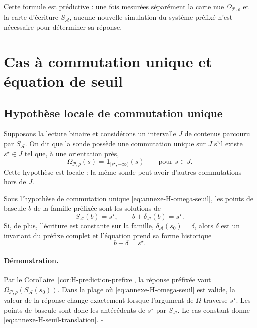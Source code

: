 Cette formule est prédictive : une fois mesurées séparément la carte nue
$\Omega_{\mathcal P,\rho}$ et la carte d'écriture
$S_{\mathcal A}$, aucune nouvelle simulation du système préfixé n'est
nécessaire pour déterminer sa réponse.

\section{Cas à commutation unique et équation de seuil}
\label{annexe-H-seuil}

\subsection{Hypothèse locale de commutation unique}
\label{annexe-H-commutation-unique}

Supposons la lecture binaire et considérons un intervalle $J$ de
contenus parcouru par $S_{\mathcal A}$. On dit que la sonde possède une
commutation unique sur $J$ s'il existe $s^{\star}\in J$ tel que, à une
orientation près,
\begin{equation}
\label{eq:annexe-H-omega-seuil}
\Omega_{\mathcal P,\rho}(s)
=
\mathbf 1_{[s^{\star},+\infty)}(s)
\qquad
\text{pour }s\in J.
\end{equation}
Cette hypothèse est locale : la même sonde peut avoir d'autres
commutations hors de $J$.

\begin{encadre}[title={Corollaire \theproposition{} --- Équation de seuil}]
Sous l'hypothèse de commutation unique
\eqref{eq:annexe-H-omega-seuil}, les points de bascule $b$ de la famille
préfixée sont les solutions de
\begin{equation}
\label{eq:annexe-H-seuil-general}
\boxed{
S_{\mathcal A}(b)=s^{\star},
\qquad
b+\delta_{\mathcal A}(b)=s^{\star}.
}
\end{equation}
Si, de plus, l'écriture est constante sur la famille,
$\delta_{\mathcal A}(s_0)=\delta$, alors $\delta$ est un invariant du
préfixe complet et l'équation prend sa forme historique
\begin{equation}
\label{eq:annexe-H-seuil-translation}
\boxed{
b+\delta=s^{\star}.
}
\end{equation}
\end{encadre}

\paragraph{Démonstration.}
Par le Corollaire~\ref{cor:H-prediction-prefixe}, la réponse préfixée vaut
$\Omega_{\mathcal P,\rho}(S_{\mathcal A}(s_0))$. Dans la plage où
\eqref{eq:annexe-H-omega-seuil} est valide, la valeur de la réponse
change exactement lorsque l'argument de $\Omega$ traverse
$s^{\star}$. Les points de bascule sont donc les antécédents de
$s^{\star}$ par $S_{\mathcal A}$. Le cas constant donne
\eqref{eq:annexe-H-seuil-translation}. \hfill$\square$

